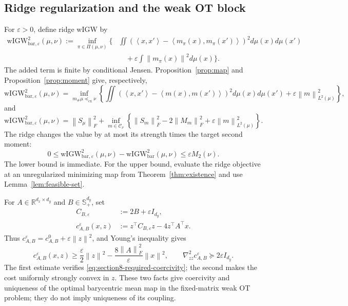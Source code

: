 \documentclass[11pt]{article}
\newcommand{\R}{\mathbb R}
\newcommand{\ip}[2]{\left\langle #1,#2\right\rangle}
\newcommand{\norm}[1]{\left\lVert #1\right\rVert}
\newcommand{\cx}{\preceq_{\mathrm{cx}}}
\newcommand{\wIGW}{\mathrm{wIGW}_{\mathrm{bar}}}
\newcommand{\wIGWeps}{\mathrm{wIGW}_{\mathrm{bar},\varepsilon}}
\theoremstyle{plain}
\theoremstyle{definition}
\theoremstyle{remark}
\begin{document}
\subsection{Ridge regularization and the weak OT block}

For \(\varepsilon>0\), define ridge wIGW by
\begin{equation}\label{eq:ridge-coupling-primal}
\begin{aligned}
  \wIGWeps^2(\mu,\nu)
  :=\inf_{\pi\in\Pi(\mu,\nu)}\Bigg\{
  &\iint\left(\ip{x}{x'}-
  \ip{m_\pi(x)}{m_\pi(x')}\right)^2d\mu(x)d\mu(x')\\
  &\quad+\varepsilon\int\norm{m_\pi(x)}^2d\mu(x)\Bigg\}.
\end{aligned}
\end{equation}
The added term is finite by conditional Jensen. Proposition~\ref{prop:map} and
Proposition~\ref{prop:moment} give, respectively,
\begin{equation}\label{eq:ridge-map-primal}
  \wIGWeps^2(\mu,\nu)
  =\inf_{m_\#\mu\cx\nu}\left\{
  \iint\left(\ip{x}{x'}-\ip{m(x)}{m(x')}\right)^2d\mu(x)d\mu(x')
  +\varepsilon\norm{m}_{L^2(\mu)}^2\right\},
\end{equation}
and
\begin{equation}\label{eq:ridge-moment-primal}
  \wIGWeps^2(\mu,\nu)=\norm{S_\mu}_F^2+
  \inf_{m\in\mathcal C_\nu}\left\{\norm{S_m}_F^2-2\norm{M_m}_F^2
  +\varepsilon\norm{m}_{L^2(\mu)}^2\right\}.
\end{equation}
The ridge changes the value by at most its strength times the target second
moment:
\[
 0\le \wIGWeps^2(\mu,\nu)-\wIGW^2(\mu,\nu)
 \le\varepsilon M_2(\nu).
\]
The lower bound is immediate. For the upper bound, evaluate the ridge objective
at an unregularized minimizing map from Theorem~\ref{thm:existence} and use
Lemma~\ref{lem:feasible-set}.

For \(A\in\R^{d_x\times d_y}\) and \(B\in\mathbb S_+^{d_y}\), set
\begin{equation}\label{eq:ridge-cost}
\begin{aligned}
 C_{B,\varepsilon}&:=2B+\varepsilon I_{d_y},\\
 c_{A,B}^\varepsilon(x,z)&:=z^\top C_{B,\varepsilon}z-4z^\top A^\top x.
\end{aligned}
\end{equation}
Thus \(c_{A,B}^\varepsilon=c_{A,B}^0+\varepsilon\norm z^2\), and Young's
inequality gives
\begin{equation}\label{eq:section8-ridge-coercivity}
 c_{A,B}^\varepsilon(x,z)
 \ge \frac{\varepsilon}{2}\norm z^2
      -\frac{8\norm A_F^2}{\varepsilon}\norm x^2,
 \qquad
 \nabla_{zz}^2c_{A,B}^\varepsilon
 \succeq2\varepsilon I_{d_y}.
\end{equation}
The first estimate verifies \eqref{eq:section8-required-coercivity}; the second
makes the cost uniformly strongly convex in \(z\). These two facts give
coercivity and uniqueness of the optimal barycentric mean map in the
fixed-matrix weak OT problem; they do not imply uniqueness of its coupling.
\end{document}
